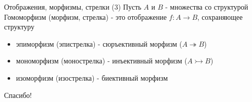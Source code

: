 \documentclass{beamer}
\begin{document}
\begin{frame}{Отображения, морфизмы, стрелки (3)}
Пусть $A$ и $B$ - множества со структурой\\ \bigskip
Гомоморфизм (морфизм, стрелка) - это отображение $f : A \to B$, сохраняющее структуру\\
  \begin{itemize}
    \item эпиморфизм (эпистрелка) - сюръективный морфизм ($A \twoheadrightarrow B$)
    \item мономорфизм (монострелка) - инъективный морфизм ($A \rightarrowtail B$)
    \item изоморфизм (изострелка) - биективный морфизм 
  \end{itemize}
\end{frame}

\begin{frame}{}
    \thispagestyle{empty}
    \begin{center}
        {\large Спасибо!}
    \end{center}
\end{frame}


\end{document}
